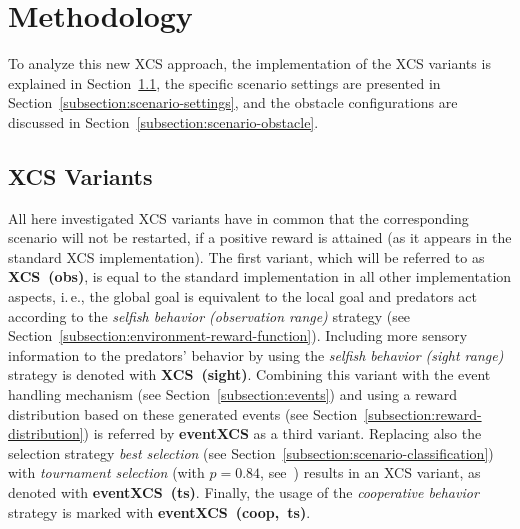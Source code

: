 \section{Methodology}
\label{section:methodology}

To analyze this new XCS approach, the implementation of the XCS variants is explained in Section~\ref{subsection:xcs-variants}, the specific scenario settings are presented in Section~\ref{subsection:scenario-settings}, and the obstacle configurations are discussed in Section~\ref{subsection:scenario-obstacle}.


\subsection{XCS Variants}
\label{subsection:xcs-variants}

All  here investigated XCS variants have in common that the corresponding scenario will not be restarted, if a positive reward is attained (as it appears in the standard XCS implementation). The first variant, which will be referred to as \textbf{XCS~(obs)}, is equal to the standard implementation in all other implementation aspects, i.\,e., the global goal is equivalent to the local goal and predators act according to the \emph{selfish behavior (observation range)} strategy (see Section~\ref{subsection:environment-reward-function}). Including more sensory information to the predators' behavior by using the \emph{selfish behavior (sight range)} strategy is denoted with \textbf{XCS~(sight)}. Combining this variant with the event handling mechanism (see Section~\ref{subsection:events}) and using a reward distribution based on these generated events (see Section~\ref{subsection:reward-distribution}) is referred by \textbf{eventXCS} as a third variant. Replacing also the selection strategy \emph{best selection} (see Section~\ref{subsection:scenario-classification}) with \emph{tournament selection} (with $p = 0.84$, see~\cite{Butz2003}) results in an XCS variant, as denoted with \textbf{eventXCS~(ts)}. Finally, the usage of the \emph{cooperative behavior} strategy is marked with \textbf{eventXCS~(coop,~ts)}.


